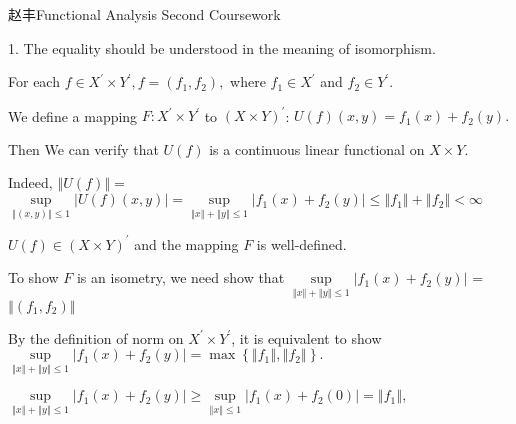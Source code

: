 \documentclass{article}
\begin{document}
\bigskip 赵丰\qquad \qquad Functional Analysis
Second Coursework


1. The equality should be understood in the meaning of isomorphism.

For each $f\in X^{\prime }\times Y^{\prime },f=\left( f_{1},f_{2}\right) ,$
where $f_{1}\in X^{\prime }$ and $f_{2}\in Y^{\prime }.$

We define a mapping $F:X^{\prime }\times Y^{\prime }$ to $\left( X\times
Y\right) ^{\prime }$: $U\left( f\right) \left( x,y\right) =f_{1}\left(
x\right) +f_{2}\left( y\right) .$

\bigskip Then We can verify that $U\left( f\right) $ is a continuous linear
functional on $X\times Y.$

Indeed, $\left\Vert U\left( f\right) \right\Vert =$ $\underset{\left\Vert
\left( x,y\right) \right\Vert \leq 1}{\sup }\left\vert U\left( f\right)
\left( x,y\right) \right\vert =\underset{\left\Vert x\right\Vert +\left\Vert
y\right\Vert \leq 1}{\sup }\left\vert f_{1}\left( x\right) +f_{2}\left(
y\right) \right\vert \leq \left\Vert f_{1}\right\Vert +\left\Vert
f_{2}\right\Vert <\infty $

$U\left( f\right) \in \left( X\times Y\right) ^{\prime }$ and the mapping $F$
is well-defined.

To show $F$ is an isometry, we need show that $\underset{\left\Vert
x\right\Vert +\left\Vert y\right\Vert \leq 1}{\sup }\left\vert f_{1}\left(
x\right) +f_{2}\left( y\right) \right\vert $ =$\left\Vert \left(
f_{1},f_{2}\right) \right\Vert $

By the definition of norm on $X^{\prime }\times Y^{\prime }$, it is
equivalent to show$\underset{\left\Vert x\right\Vert +\left\Vert
y\right\Vert \leq 1}{\sup }\left\vert f_{1}\left( x\right) +f_{2}\left(
y\right) \right\vert =\max \left\{ \left\Vert f_{1}\right\Vert ,\left\Vert
f_{2}\right\Vert \right\} .$

$\underset{\left\Vert x\right\Vert +\left\Vert y\right\Vert \leq 1}{\sup }%
\left\vert f_{1}\left( x\right) +f_{2}\left( y\right) \right\vert \geq 
\underset{\left\Vert x\right\Vert \leq 1}{\sup }\left\vert f_{1}\left(
x\right) +f_{2}\left( 0\right) \right\vert =\left\Vert f_{1}\right\Vert ,$
\end{document}
